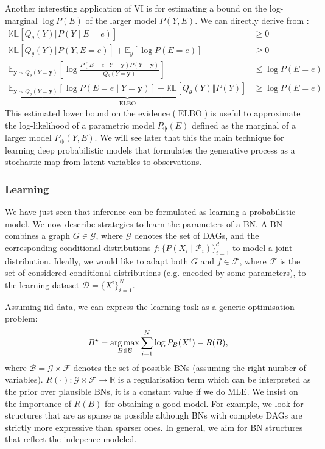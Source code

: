 Another interesting application of VI is for estimating a bound on the log-marginal $\log P(E)$ of the larger model $P(Y, E)$. We can directly derive from :
\begin{align}
  \mathbb{KL}\left[Q_\theta(Y)\Vert P(Y\mid E=e)\right] &\geq 0\\
  \mathbb{KL}\left[Q_\theta(Y)\Vert P(Y, E=e) \right] + \mathbb{E}_{y}\left[\log P(E=e)\right] &\geq 0\\
  \mathbb{E}_{\bm y \sim Q_\theta(Y=\bm{y})}\left[ \log \frac{P(E=e\mid Y=\bm{y}) P(Y=\bm{y})}{Q_\theta(Y=\bm{y})} \right] &\leq \log P(E=e)\\
  \underbrace{\mathbb{E}_{\bm y \sim Q_\theta(Y=\bm{y})}\left[ \log P(E=e\mid Y=\bm{y})\right] - \mathbb{KL}\left[Q_\theta(Y)\Vert P(Y)\right]}_{\operatorname{ELBO}} &\geq \log P(E=e) \label{eq:elbo}
\end{align}
This estimated lower bound on the evidence ($\operatorname{ELBO}$) is useful to approximate the log-likelihood of a parametric model $P_{\bm \psi}(E)$ defined as the marginal of a larger model $P_{\bm \psi}(Y, E)$.
We will see later that this the main technique for learning deep probabilistic models that formulates the generative process as a stochastic map from latent variables to observations.
\subsubsection{Learning}
We have just seen that inference can be formulated as learning a probabilistic model. We now describe strategies to learn the parameters of a BN.
A BN combines a graph $G \in \mathcal{G}$, where $\mathcal{G}$ denotes the set of DAGs, and the corresponding conditional distributions $f: \{P(X_i\mid \mathcal{P}_i)\}_{i=1}^d$ to model a joint distribution. Ideally, we would like to adapt both $G$ and $f \in \mathcal{F}$, where $\mathcal{F}$ is the set of considered conditional distributions (e.g. encoded by some parameters), to the learning dataset $\mathcal{D}=\{X^i\}_{i=1}^N$.

Assuming iid data, we can express the learning task as a generic optimisation problem:
\begin{align}
  B^\star  = \operatorname*{arg\,max}_{B\in\mathcal{B}} \sum_{i=1}^N \log P_B(X^i) - R(B), \label{eq:learn_BN}
\end{align}
where $\mathcal{B} = \mathcal{G} \times \mathcal{F}$ denotes the set of possible BNs (assuming the right number of variables). $R(\cdot): \mathcal{G} \times \mathcal{F} \rightarrow \mathbb{R}$ is a regularisation term which can be interpreted as the prior over plausible BNs, it is a constant value if we do MLE. We insist on the importance of $R(B)$ for obtaining a good model. For example, we look for structures that are as sparse as possible although BNs with complete DAGs are strictly more expressive than sparser ones. In general, we aim for BN structures that reflect the indepence modeled.

